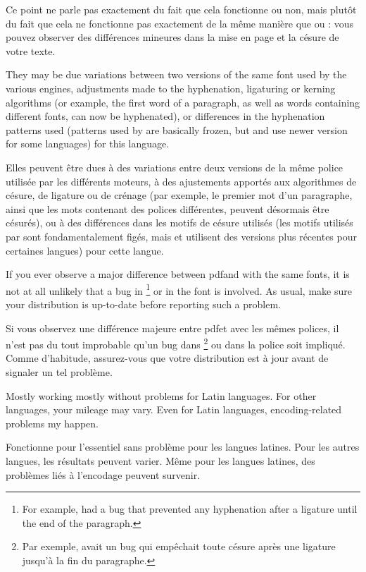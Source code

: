 \documentclass{lltxdoc}
\begin{document}
{Ce point ne parle pas exactement du fait que cela fonctionne ou non, mais plutôt du fait que cela ne fonctionne pas exactement de la même manière que \pdftex ou \xetex: vous pouvez observer des différences mineures dans la mise en page et la césure de votre texte.

They may be due variations between two versions of the same font used by the
various engines, adjustments made to the hyphenation, ligaturing or kerning
algorithms (or example, the first word of a paragraph, as well as words
containing different fonts, can now be hyphenated), or differences in the
hyphenation patterns used (patterns used by \pdftex are basically frozen, but
\luatex and \xetex use newer version for some languages) for this language.

Elles peuvent être dues à des variations entre deux versions de la même police utilisée par les différents moteurs, à des ajustements apportés aux algorithmes de césure, de ligature ou de crénage (par exemple, le premier mot d'un paragraphe, ainsi que les mots contenant des polices différentes, peuvent désormais être césurés), ou à des différences dans les motifs de césure utilisés (les motifs utilisés par \pdftex sont fondamentalement figés, mais \luatex et \xetex utilisent des versions plus récentes pour certaines langues) pour cette langue.

If you ever observe a major difference between pdf\latex and \lualatex with
the same fonts, it is not at all unlikely that a bug in \luatex\footnote{For
  example,  had a bug that prevented any hyphenation after a
  \code{-{}-{}-} ligature until the end of the paragraph.} or in the font is
involved. As usual, make sure your distribution is up-to-date before reporting
such a problem.

Si vous observez une différence majeure entre pdf\latex et \lualatex avec les mêmes polices, il n'est pas du tout improbable qu'un bug dans \luatex\footnote{Par exemple,  avait un bug qui empêchait toute césure après une ligature \code{-{}-{}-} jusqu'à la fin du paragraphe.} ou dans la police soit impliqué. Comme d'habitude, assurez-vous que votre distribution est à jour avant de signaler un tel problème.

Mostly working mostly without problems for Latin languages. For other
languages, your mileage may vary. Even for Latin languages, encoding-related
problems my happen.

Fonctionne pour l'essentiel sans problème pour les langues latines. Pour les autres langues, les résultats peuvent varier. Même pour les langues latines, des problèmes liés à l'encodage peuvent survenir.

}
\end{document}
